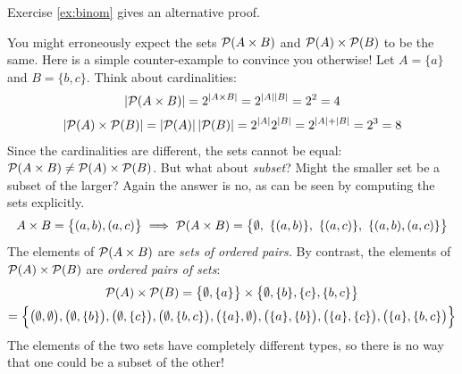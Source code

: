 Exercise \ref{ex:binom} gives an alternative proof.


\begin{example}{}{}
	You might erroneously expect the sets $\mathcal{P}(A\times B)$ and $\mathcal{P}(A)\times\mathcal{P}(B)$ to be the same. Here is a simple counter-example to convince you otherwise!\smallbreak
	Let $A=\{a\}$ and $B=\{b,c\}$. Think about cardinalities:
	\begin{gather*}
		\left| \mathcal{P}(A\times B)\right|=2^{\left| A\times B\right|}=2^{\left| A\right|\left| B\right|}=2^2=4\\[2pt]
		\left| \mathcal{P}(A)\times\mathcal{P}(B)\right| =\left| \mathcal{P}(A)\right|\left| \mathcal{P}(B)\right| =2^{\left| A\right|}2^{\left| B\right|}=2^{\left| A\right|+\left| B\right|}=2^3=8
	\end{gather*}
	Since the cardinalities are different, the sets cannot be equal: $\mathcal{P}(A\times B)\neq \mathcal{P}(A)\times\mathcal{P}(B)$. But what about \emph{subset}? Might the smaller set be a subset of the larger? Again the answer is no, as can be seen by computing the sets explicitly.
	\[
		A\times B=\bigl\{(a,b),(a,c)\bigr\} \implies \cP(A\times B)=\big\{\emptyset,\ \{(a,b)\},\ \{(a,c)\},\ \{(a,b),(a,c)\}\big\}
	\]
	The elements of $\mathcal{P}(A\times B)$ are \emph{sets of ordered pairs.} By contrast, the elements of $\mathcal{P}(A)\times\mathcal{P}(B)$ are \emph{ordered pairs of sets}:
	\begin{multline*}
			\mathcal{P}(A)\times\mathcal{P}(B) =\big\{\emptyset,\{a\}\big\}\times \big\{\emptyset,\{b\},\{c\},\{b,c\}\big\}\\*
			=\Bigl\{\bigl(\emptyset,\emptyset\bigr), \bigl(\emptyset,\{b\}\bigr), \bigl(\emptyset,\{c\}\bigr), \bigl(\emptyset,\{b,c\}\bigr), \bigl(\{a\},\emptyset\bigr), \bigl(\{a\},\{b\}\bigr), \bigl(\{a\},\{c\}\bigr), \bigl(\{a\},\{b,c\}\bigr)\Bigr\}
	\end{multline*}
	The elements of the two sets have completely different types, so there is no way that one could be a subset of the other!
\end{example}

\goodbreak



